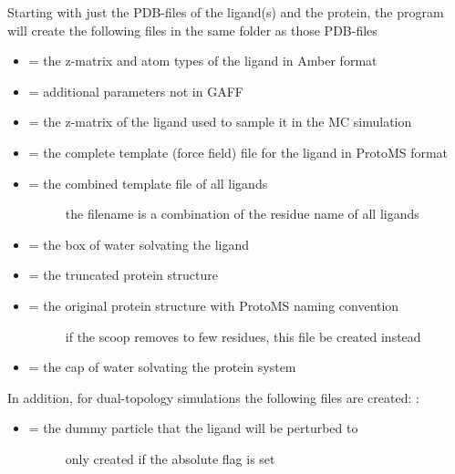 \documentclass[letterpaper,10pt,english]{sphinxmanual}
\begin{document}
Starting with just the PDB-files of the ligand(s) and the protein, the program will create the following files in the same folder as those PDB-files
\begin{itemize}
\item {} 
 = the z-matrix and atom types of the ligand in Amber format

\item {} 
 = additional parameters not in GAFF

\item {} 
 = the z-matrix of the ligand used to sample it in the MC simulation

\item {} 
 = the complete template (force field) file for the ligand in ProtoMS format

\item {} \begin{description}
\item[{ = the combined template file of all ligands}] \leavevmode
the filename is a combination of the residue name of all ligands

\end{description}

\item {} 
 = the box of water solvating the ligand

\item {} 
 = the truncated protein structure

\item {} \begin{description}
\item[{ = the original protein structure with ProtoMS naming convention}] \leavevmode
if the scoop removes to few residues, this file be created instead

\end{description}

\item {} 
 = the cap of water solvating the protein system

\end{itemize}

In addition, for dual-topology simulations the following files are created: :
\begin{itemize}
\item {} \begin{description}
\item[{ = the dummy particle that the ligand will be perturbed to}] \leavevmode
only created if the \textendash{}absolute flag is set

\end{description}

\end{itemize}
\end{document}
